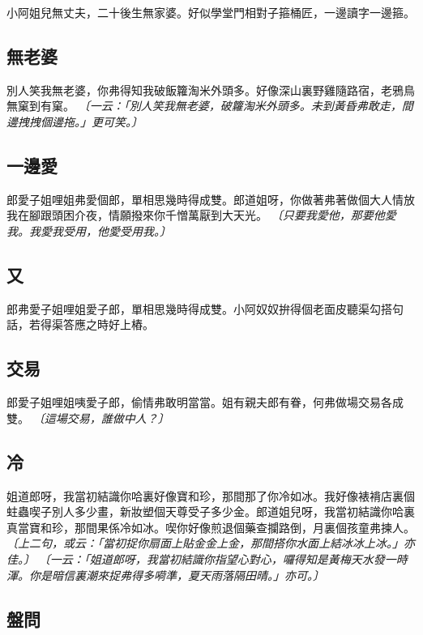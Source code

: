 小阿姐兒無丈夫，二十後生無家婆。好似學堂門相對子箍桶匠，一邊讀字一邊箍。

\subsection*{無老婆}

別人笑我無老婆，你弗得知我破飯籮淘米外頭多。好像深山裏野雞隨路宿，老鴉鳥無窠到有窠。
\textit{〔一云：「別人笑我無老婆，破籮淘米外頭多。未到黃昏弗敢走，間邊拽拽個邊拖。」更可笑。〕}

\subsection*{一邊愛}

郎愛子姐哩姐弗愛個郎，單相思幾時得成雙。郎道姐呀，你做著弗著做個大人情放我在腳跟頭困介夜，情願撥來你千憎萬厭到大天光。
\textit{〔只要我愛他，那要他愛我。我愛我受用，他愛受用我。〕}

\subsection*{又}

郎弗愛子姐哩姐愛子郎，單相思幾時得成雙。小阿奴奴拚得個老面皮聽渠勾搭句話，若得渠答應之時好上樁。

\subsection*{交易}

郎愛子姐哩姐咦愛子郎，偷情弗敢明當當。姐有親夫郎有眷，何弗做場交易各成雙。
\textit{〔這場交易，誰做中人？〕}

\subsection*{冷}

姐道郎呀，我當初結識你哈裏好像寶和珍，那間那了你冷如冰。我好像裱褙店裏個蛀蟲喫子別人多少畫，新妝塑個天尊受子多少金。郎道姐兒呀，我當初結識你哈裏真當寶和珍，那間果係冷如冰。喫你好像煎退個藥查攔路倒，月裏個孩童弗揀人。
\textit{〔上二句，或云：「當初捉你扇面上貼金金上金，那間搭你水面上結冰冰上冰。」亦佳。〕}
\textit{〔一云：「姐道郎呀，我當初結識你指望心對心，囉得知是黃梅天水發一時渾。你是暗信裏潮來捉弗得多嗬準，夏天雨落隔田晴。」亦可。〕}

\subsection*{盤問}

